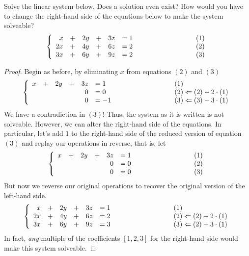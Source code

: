 \documentclass{tutorial}
\begin{document}
\begin{prob} Solve the linear system below. Does a solution even exist? How would you have to change the right-hand side of the equations below to make the system solveable?
\[
	\lb \begin{array}{rcrcrlp{1in}l}
		 x &+&  2y &+& 3z &= 1 &\mbox{}& (1) \\
		2x &+&  4y &+& 6z &= 2 &\mbox{}& (2) \\ 
		3x &+&  6y &+& 9z &= 2 &\mbox{}& (3) \\ 
	\end{array} \right.
\]
\end{prob} \ifsolns \begin{proof}
Begin as before, by eliminating $x$ from equations $(2)$ and $(3)$
\[
	\lb \begin{array}{rcrcrlp{1in}l}
		 x &+&  2y &+& 3z &= 1 &\mbox{}& (1) \\
		   & &     & &  0 &= 0 &\mbox{}& (2) \Leftarrow (2) - 2 \cdot (1) \\
		   & &     & &  0 &=-1 &\mbox{}& (3) \Leftarrow (3) - 3 \cdot (1) \\
	\end{array} \right.
\]
We have a contradiction in $(3)$! Thus, the system as it is written is not solveable. However, we can alter the right-hand side of the equations. In particular, let's add $1$ to the right-hand side of the reduced version of equation $(3)$ and replay our operations in reverse, that is, let
\[
	\lb \begin{array}{rcrcrlp{1in}l}
		 x &+&  2y &+& 3z &= 1 &\mbox{}& (1) \\
		   & &     & &  0 &= 0 &\mbox{}& (2) \\
		   & &     & &  0 &= 0 &\mbox{}& (3) \\
	\end{array} \right.
\]
But now we reverse our original operations to recover the original version of the left-hand side.
\[
	\lb \begin{array}{rcrcrlp{1in}l}
		 x &+&  2y &+& 3z &= 1 &\mbox{}& (1) \\
		2x &+&  4y &+& 6z &= 2 &\mbox{}& (2) \Leftarrow (2) + 2 \cdot (1)\\ 
		3x &+&  6y &+& 9z &= 3 &\mbox{}& (3) \Leftarrow (2) + 3 \cdot (1)\\ 
	\end{array} \right.
\]
In fact, \emph{any} multiple of the coefficients $[1,2,3]$ for the right-hand side would make this system solveable.
\end{proof}\else \newpage \fi
\end{document}
